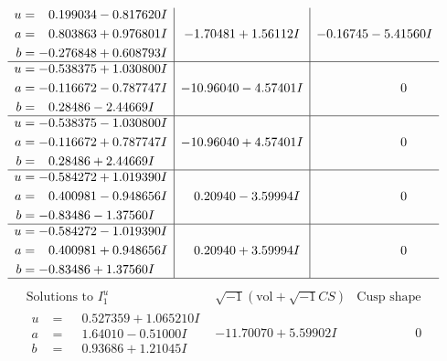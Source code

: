 \documentclass[1p]{elsarticle_modified}
\theoremstyle{definition}
\newcommand{\I}{\sqrt{-1}}
\begin{document}
$$\begin{array}{c|c|c}
\begin{aligned}
u &= \phantom{-}0.199034 - 0.817620 I \\
a &= \phantom{-}0.803863 + 0.976801 I \\
b &= -0.276848 + 0.608793 I\end{aligned}
 & -1.70481 + 1.56112 I & -0.16745 - 5.41560 I \\ \hline\begin{aligned}
u &= -0.538375 + 1.030800 I \\
a &= -0.116672 - 0.787747 I \\
b &= \phantom{-}0.28486 - 2.44669 I\end{aligned}
 & -10.96040 - 4.57401 I & \phantom{-0.000000 } 0 \\ \hline\begin{aligned}
u &= -0.538375 - 1.030800 I \\
a &= -0.116672 + 0.787747 I \\
b &= \phantom{-}0.28486 + 2.44669 I\end{aligned}
 & -10.96040 + 4.57401 I & \phantom{-0.000000 } 0 \\ \hline\begin{aligned}
u &= -0.584272 + 1.019390 I \\
a &= \phantom{-}0.400981 - 0.948656 I \\
b &= -0.83486 - 1.37560 I\end{aligned}
 & \phantom{-}0.20940 - 3.59994 I & \phantom{-0.000000 } 0 \\ \hline\begin{aligned}
u &= -0.584272 - 1.019390 I \\
a &= \phantom{-}0.400981 + 0.948656 I \\
b &= -0.83486 + 1.37560 I\end{aligned}
 & \phantom{-}0.20940 + 3.59994 I & \phantom{-0.000000 } 0\\
 \hline 
 \end{array}$$\newpage$$\begin{array}{c|c|c}  
\text{Solutions to }I^u_{1}& \I (\text{vol} + \sqrt{-1}CS) & \text{Cusp shape}\\
 \hline 
\begin{aligned}
u &= \phantom{-}0.527359 + 1.065210 I \\
a &= \phantom{-}1.64010 - 0.51000 I \\
b &= \phantom{-}0.93686 + 1.21045 I\end{aligned}
 & -11.70070 + 5.59902 I & \phantom{-0.000000 } 0 \\ \hline\begin{aligned}

\end{aligned}
\end{array}$$
\end{document}
